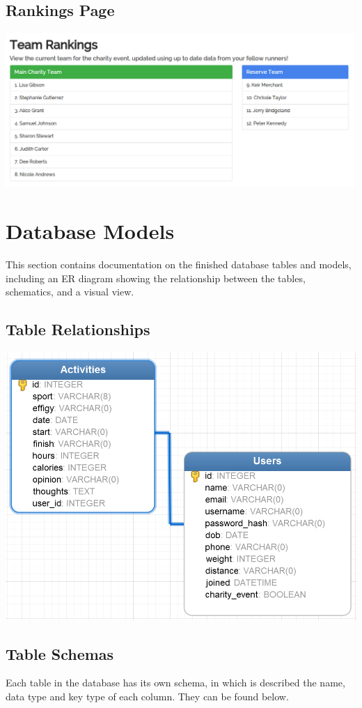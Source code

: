 \documentclass{article}[12pt,a4paper]
\begin{document}
\subsection{Rankings Page}
\includegraphics[scale=0.35]{final_ui/rankings}

\section{Database Models}
This section contains documentation on the finished database tables and models, including an ER diagram showing the relationship between the tables, schematics, and a visual view.

\subsection{Table Relationships}
\includegraphics[scale=0.4]{images/database/er_diagram}

\subsection{Table Schemas}
Each table in the database has its own schema, in which is described the name, data type and key type of each column. They can be found below.
\end{document}
